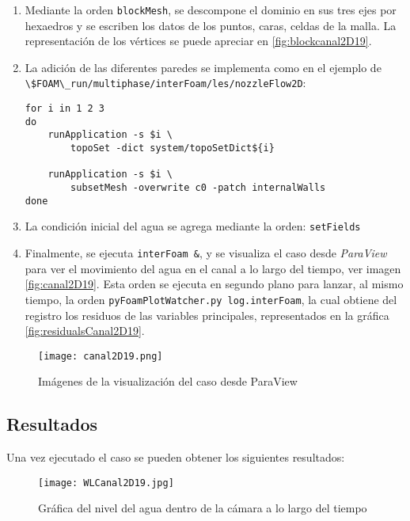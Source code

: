 \begin{enumerate}
\def\labelenumi{\arabic{enumi}.}
\item
  Mediante la orden \texttt{blockMesh}, se descompone el dominio en sus
  tres ejes por hexaedros y se escriben los datos de los puntos, caras,
  celdas de la malla. La representación de los vértices se puede apreciar en \autoref{fig:blockcanal2D19}.

\item
  La adición de las diferentes paredes se implementa como en el ejemplo
  de
  \lstinline[style=bash]{\$FOAM\_run/multiphase/interFoam/les/nozzleFlow2D}:

\begin{lstlisting}[style=c++]
for i in 1 2 3
do
    runApplication -s $i \
        topoSet -dict system/topoSetDict${i}

    runApplication -s $i \
        subsetMesh -overwrite c0 -patch internalWalls
done
\end{lstlisting}

\item
  La condición inicial del agua se agrega mediante la orden:
  \texttt{setFields}
\item
  Finalmente, se ejecuta \texttt{interFoam\ \&}, y se visualiza el caso desde \emph{ParaView} para ver el movimiento del agua en el canal a lo largo del tiempo, ver imagen \autoref{fig:canal2D19}. Esta orden se ejecuta en segundo plano para
  lanzar, al mismo tiempo, la orden
  \texttt{pyFoamPlotWatcher.py\ log.interFoam}, la cual obtiene del
  registro los residuos de las variables principales, representados en la gráfica \autoref{fig:residualsCanal2D19}.

\end{enumerate}

\begin{figure}
\centering
\texttt{[image: canal2D19.png]}
\caption{Imágenes de la visualización del caso desde ParaView}
\label{fig:canal2D19}
\end{figure}

\subsection{Resultados}\label{header-n173}

Una vez ejecutado el caso se pueden obtener los siguientes resultados:

\begin{figure}
\centering
\texttt{[image: WLCanal2D19.jpg]}
\caption[Gráfica del nivel del agua]{Gráfica del nivel del agua dentro de la cámara a lo largo del tiempo}
\label{fig:WLCanal2D19}
\end{figure}

